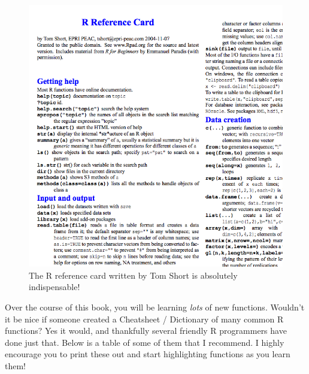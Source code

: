 \documentclass[]{book}
\theoremstyle{definition}
\theoremstyle{definition}
\theoremstyle{remark}
\begin{document}
\begin{figure}

{\centering \includegraphics[width=0.75\linewidth]{images/rreferencess} 

}

\caption{The R reference card written by Tom Short is absolutely indispensable!}\label{fig:rreferencecard}
\end{figure}

Over the course of this book, you will be learning \emph{lots} of new
functions. Wouldn't it be nice if someone created a Cheatsheet /
Dictionary of many common R functions? Yes it would, and thankfully
several friendly R programmers have done just that. Below is a table of
some of them that I recommend. I highly encourage you to print these out
and start highlighting functions as you learn them!
\end{document}

